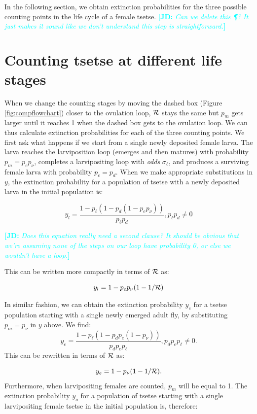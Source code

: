 \documentclass[smallextended]{svjour3}
\newcommand{\comment}[3]{\textcolor{#1}{\textbf{[#2: }\textit{#3}\textbf{]}}}
\newcommand{\jd}[1]{\comment{cyan}{JD}{#1}}
\begin{document}
In the following section, we obtain extinction probabilities  for the three possible counting points in the life cycle of a female tsetse. \jd{Can we delete this \P? It just makes it sound like we don't understand this step is straightforward.}

\section{Counting tsetse at different life stages}

When we change the counting stages by moving the dashed box (Figure \ref{fig:compflowchart}) closer to the ovulation loop, ${\cal R}$ stays the same but $p_m$ gets larger until it reaches 1 when the dashed box gets to the ovulation loop. We can thus calculate extinction probabilities for each of  the three counting points. We first ask what happens if we start from a single newly deposited female larva.
The larva reaches the larviposition loop (emerges and then matures) with probability $p_m = p_e p_{\nu}$, completes a larvipositing loop with \textit{odds} $\sigma_\ell$, and produces a surviving female larva with probability $p_c = p_d$. 
When we make appropriate substitutions in $y$, the extinction probability for a population of tsetse with a newly deposited larva in the initial population is:

$$y_l = \frac{1-p_{\ell}(1 - p_{d}(1 - p_{e}p_{\nu}))}{p_{\ell}p_{d}}, p_{\ell}p_{d} \neq 0$$

\jd{Does this equation really need a second clause? It should be obvious that we're assuming none of the steps on our loop have probability 0, or else we wouldn't have a loop.}

This can be written more compactly in terms of ${\cal R}$ as:

\begin{equation}
	\label{larvExtinction}
	y_l = 1 - p_ep_{\nu}(1-1/{\cal R})	
\end{equation}

In similar fashion, we can obtain the extinction probability $y_e$ for a tsetse population starting with a single newly emerged adult fly, by substituting  $p_m = p_{\nu}$ in $y$ above.
We find:
$$ y_e=\frac{1- p_{\ell}(1 -p_{d}p_{e}(1- p_{\nu}))}{p_{d}p_{e}p_{\ell}},  p_{d}p_{e}p_{\ell} \neq 0. $$ This can be rewritten in terms of ${\cal R}$ as:

\begin{equation}
	\label{emergeExtinction}
	y_e = 1 - p_{\nu}(1-1/{\cal R}).	
\end{equation}
Furthermore, when  larvipositing females are counted, $p_m$ will be equal to 1. The extinction probability $y_o$ for a population of tsetse starting with a single larvipositing female tsetse in the initial population is, therefore:
\end{document}
